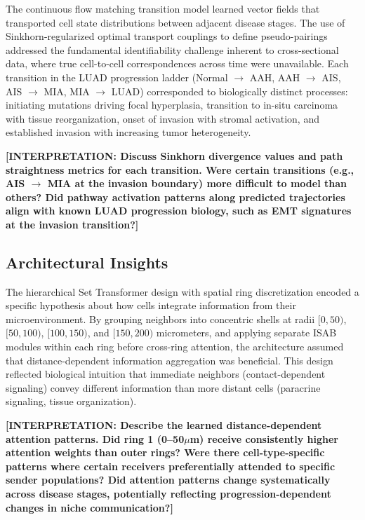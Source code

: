 The continuous flow matching transition model learned vector fields that transported cell state distributions between adjacent disease stages. The use of Sinkhorn-regularized optimal transport couplings to define pseudo-pairings addressed the fundamental identifiability challenge inherent to cross-sectional data, where true cell-to-cell correspondences across time were unavailable. Each transition in the LUAD progression ladder (Normal $\to$ AAH, AAH $\to$ AIS, AIS $\to$ MIA, MIA $\to$ LUAD) corresponded to biologically distinct processes: initiating mutations driving focal hyperplasia, transition to in-situ carcinoma with tissue reorganization, onset of invasion with stromal activation, and established invasion with increasing tumor heterogeneity.

\textbf{[INTERPRETATION: Discuss Sinkhorn divergence values and path straightness metrics for each transition. Were certain transitions (e.g., AIS $\to$ MIA at the invasion boundary) more difficult to model than others? Did pathway activation patterns along predicted trajectories align with known LUAD progression biology, such as EMT signatures at the invasion transition?]}


\subsection{Architectural Insights}

The hierarchical Set Transformer design with spatial ring discretization encoded a specific hypothesis about how cells integrate information from their microenvironment. By grouping neighbors into concentric shells at radii $[0, 50)$, $[50, 100)$, $[100, 150)$, and $[150, 200)$ micrometers, and applying separate ISAB modules within each ring before cross-ring attention, the architecture assumed that distance-dependent information aggregation was beneficial. This design reflected biological intuition that immediate neighbors (contact-dependent signaling) convey different information than more distant cells (paracrine signaling, tissue organization).

\textbf{[INTERPRETATION: Describe the learned distance-dependent attention patterns. Did ring 1 (0--50$\mu$m) receive consistently higher attention weights than outer rings? Were there cell-type-specific patterns where certain receivers preferentially attended to specific sender populations? Did attention patterns change systematically across disease stages, potentially reflecting progression-dependent changes in niche communication?]}

